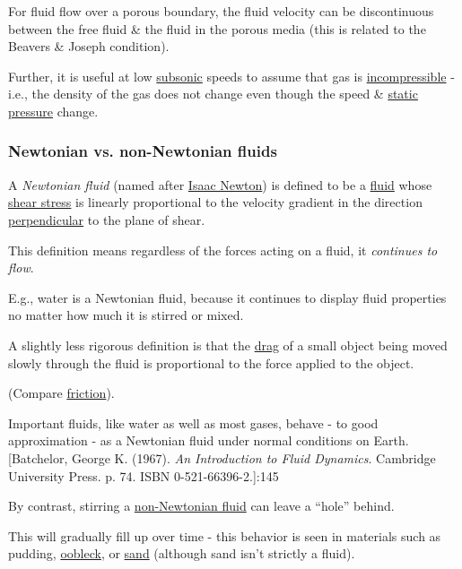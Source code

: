 \documentclass{article}
\begin{document}
%
For fluid flow over a porous boundary, the fluid velocity can be discontinuous between the free fluid \& the fluid in the porous media (this is related to the Beavers \& Joseph condition).

Further, it is useful at low \href{https://en.wikipedia.org/wiki/Speed_of_sound}{subsonic} speeds to assume that gas is \href{https://en.wikipedia.org/wiki/Incompressible_fluid}{incompressible} - i.e., the density of the gas does not change even though the speed \& \href{https://en.wikipedia.org/wiki/Static_pressure}{static pressure} change.

\subsubsection{Newtonian vs. non-Newtonian fluids}
A \textit{Newtonian fluid} (named after \href{https://en.wikipedia.org/wiki/Isaac_Newton}{Isaac Newton}) is defined to be a \href{https://en.wikipedia.org/wiki/Fluid}{fluid} whose \href{https://en.wikipedia.org/wiki/Shear_stress}{shear stress} is linearly proportional to the velocity gradient in the direction \href{https://en.wikipedia.org/wiki/Perpendicular}{perpendicular} to the plane of shear.

This definition means regardless of the forces acting on a fluid, it \textit{continues to flow}.

E.g., water is a Newtonian fluid, because it continues to display fluid properties no matter how much it is stirred or mixed.

A slightly less rigorous definition is that the \href{https://en.wikipedia.org/wiki/Drag_(physics)}{drag} of a small object being moved slowly through the fluid is proportional to the force applied to the object.

(Compare \href{https://en.wikipedia.org/wiki/Friction}{friction}).

Important fluids, like water as well as most gases, behave - to good approximation - as a Newtonian fluid under normal conditions on Earth.[Batchelor, George K. (1967). \textit{An Introduction to Fluid Dynamics}. Cambridge University Press. p. 74. ISBN 0-521-66396-2.]:145

%
By contrast, stirring a \href{https://en.wikipedia.org/wiki/Non-Newtonian_fluid}{non-Newtonian fluid} can leave a ``hole'' behind.

This will gradually fill up over time - this behavior is seen in materials such as pudding, \href{https://en.wikipedia.org/wiki/Non-newtonian_fluid#Oobleck}{oobleck}, or \href{https://en.wikipedia.org/wiki/Sand}{sand} (although sand isn't strictly a fluid).
\end{document}
